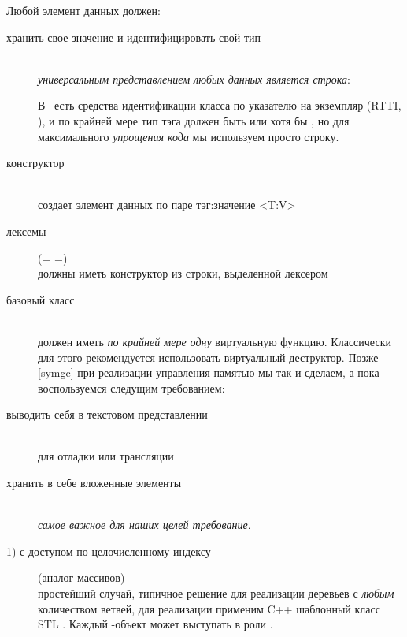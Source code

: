 \clearpage
Любой элемент данных должен:
\begin{description}
\item[хранить свое значение и идентифицировать свой тип]\ \\\emph{универсальным
представлением любых данных является строка}:

В \cpp\ есть средства идентификации класса по указателю на экземпляр (RTTI,
), и по крайней мере тип тэга должен быть  или
хотя бы , но для максимального \emph{упрощения кода} мы
используем просто строку.

\item[конструктор]\ \\создает элемент данных по паре тэг:значение <T:V>
\item[лексемы] (= =)\ \\должны иметь конструктор из
строки, выделенной лексером
\clearpage
\item[базовый класс]\ \\должен иметь \emph{по крайней мере одну} виртуальную
функцию. Классически для этого рекомендуется использовать виртуальный
деструктор. Позже \ref{symgc} при реализации управления памятью мы так и
сделаем, а пока воспользуемся следущим требованием:
\item[выводить себя в текстовом представлении]\ \\для отладки или трансляции

\item[хранить в себе вложенные элементы]\ \\\emph{самое важное для наших целей
требование}. 

\item[1) с доступом по целочисленному индексу] (аналог массивов)\ \\
простейший случай, типичное решение для реализации деревьев с \emph{любым}
количеством ветвей, для реализации применим C++ шаблонный класс STL
. Каждый -объект может выступать
в роли .


\end{description}
